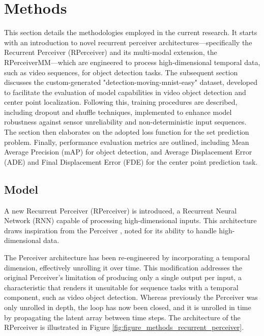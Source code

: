 \section{Methods}  \label{Methods}

This section details the methodologies employed in the current research. It starts with an introduction to novel recurrent perceiver architectures—specifically the Recurrent Perceiver (RPerceiver) and its multi-modal extension, the RPerceiverMM—which are engineered to process high-dimensional temporal data, such as video sequences, for object detection tasks. The subsequent section discusses the custom-generated "detection-moving-mnist-easy" dataset, developed to facilitate the evaluation of model capabilities in video object detection and center point localization. Following this, training procedures are described, including dropout and shuffle techniques, implemented to enhance model robustness against sensor unreliability and non-deterministic input sequences. The section then elaborates on the adopted loss function for the set prediction problem. Finally, performance evaluation metrics are outlined, including Mean Average Precision (mAP) for object detection, and Average Displacement Error (ADE) and Final Displacement Error (FDE) for the center point prediction task.

\subsection{Model} \label{Methods:Model}

A new Recurrent Perceiver (RPerceiver) is introduced, a Recurrent Neural Network (RNN) capable of processing high-dimensional inputs. This architecture draws inspiration from the Perceiver \cite{jaeglePerceiverGeneralPerception2021}, noted for its ability to handle high-dimensional data.

The Perceiver architecture has been re-engineered by incorporating a temporal dimension, effectively unrolling it over time. This modification addresses the original Perceiver's limitation of producing only a single output per input, a characteristic that renders it unsuitable for sequence tasks with a temporal component, such as video object detection. Whereas previously the Perceiver was only unrolled in depth, the loop has now been closed, and it is unrolled in time by propagating the latent array between time steps. The architecture of the RPerceiver is illustrated in Figure \ref{fig:figure_methods_recurrent_perceiver}.

